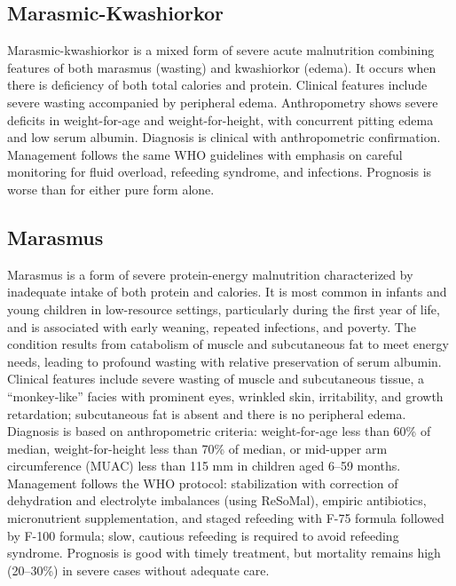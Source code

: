 \subsection{Marasmic-Kwashiorkor}
\label{sec:Marasmic-Kwashiorkor}
Marasmic-kwashiorkor is a mixed form of severe acute malnutrition combining features of both marasmus (wasting) and kwashiorkor (edema). It occurs when there is deficiency of both total calories and protein. Clinical features include severe wasting accompanied by peripheral edema. Anthropometry shows severe deficits in weight-for-age and weight-for-height, with concurrent pitting edema and low serum albumin. Diagnosis is clinical with anthropometric confirmation. Management follows the same WHO guidelines with emphasis on careful monitoring for fluid overload, refeeding syndrome, and infections. Prognosis is worse than for either pure form alone.

\subsection{Marasmus}
\label{sec:Marasmus}
Marasmus is a form of severe protein-energy malnutrition characterized by inadequate intake of both protein and calories. It is most common in infants and young children in low-resource settings, particularly during the first year of life, and is associated with early weaning, repeated infections, and poverty. The condition results from catabolism of muscle and subcutaneous fat to meet energy needs, leading to profound wasting with relative preservation of serum albumin. Clinical features include severe wasting of muscle and subcutaneous tissue, a ``monkey-like'' facies with prominent eyes, wrinkled skin, irritability, and growth retardation; subcutaneous fat is absent and there is no peripheral edema. Diagnosis is based on anthropometric criteria: weight-for-age less than 60\% of median, weight-for-height less than 70\% of median, or mid-upper arm circumference (MUAC) less than 115 mm in children aged 6--59 months. Management follows the WHO protocol: stabilization with correction of dehydration and electrolyte imbalances (using ReSoMal), empiric antibiotics, micronutrient supplementation, and staged refeeding with F-75 formula followed by F-100 formula; slow, cautious refeeding is required to avoid refeeding syndrome. Prognosis is good with timely treatment, but mortality remains high (20--30\%) in severe cases without adequate care.

